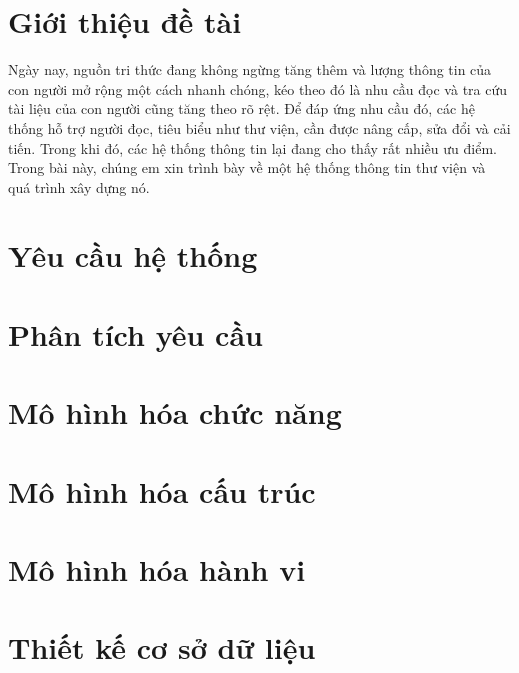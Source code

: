 \documentclass[12pt]{report}
\begin{document}


\tableofcontents 
\newpage

\newpage
\setcounter{page}{1}

\section{Giới thiệu đề tài}
Ngày nay, nguồn tri thức đang không ngừng tăng thêm và lượng thông tin của con người mở rộng một cách nhanh chóng, 
kéo theo đó là nhu cầu đọc và tra cứu tài liệu của con người cũng tăng theo rõ rệt. 
Để đáp ứng nhu cầu đó, các hệ thống hỗ trợ người đọc, tiêu biểu như thư viện, cần được nâng cấp, 
sửa đổi và cải tiến. Trong khi đó, các hệ thống thông tin lại đang cho thấy rất nhiều ưu điểm. 
Trong bài này, chúng em xin trình bày về một hệ thống thông tin thư viện và quá trình xây dựng nó.

\section{Yêu cầu hệ thống}


\section{Phân tích yêu cầu}


\section{Mô hình hóa chức năng}


\section{Mô hình hóa cấu trúc}


\section{Mô hình hóa hành vi}


\section{Thiết kế cơ sở dữ liệu}

\end{document}
